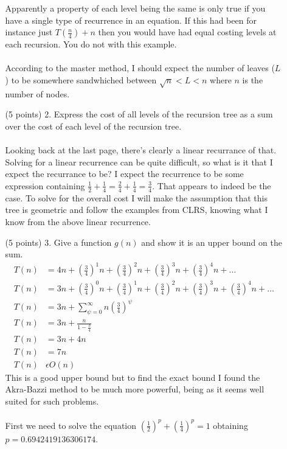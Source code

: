 \documentclass[paper=a4,fontsize=11pt]{article}
\begin{document}
\begin{enumerate}
\begin{enumerate}
Apparently a property of each level being the same is only true if you have a single type of recurrence in an equation. If this had been for instance just $T(\frac{n}{4}) + n$ then you would have had equal costing levels at each recursion. You do not with this example.\\\\
According to the master method, I should expect the number of leaves ($L$) to be somewhere sandwhiched between $\sqrt{n} < L < n$ where $n$ is the number of nodes.\\
\item [(5 points) 2.] Express the cost of all levels of the recursion tree as a sum over the cost of each level of the recursion tree.\\\\
Looking back at the last page, there's clearly a linear recurrance of that. Solving for a linear recurrence can be quite difficult, so what is it that I expect the recurrance to be? I expect the recurrence to be some expression containing $\frac{1}{2}+\frac{1}{4}=\frac{2}{4}+\frac{1}{4}=\frac{3}{4}$. That appears to indeed be the case. To solve for the overall cost I will make the assumption that this tree is geometric and follow the examples from CLRS, knowing what I know from the above linear recurrence.\\
\item [(5 points) 3.] Give a function $g (n)$ and show it is an upper bound on the sum.
\begin{align*}
T(n) &= 4n + (\frac{3}{4})^1n+(\frac{3}{4})^2n+(\frac{3}{4})^3n+(\frac{3}{4})^4n+\dots\\
T(n) &= 3n + (\frac{3}{4})^0n + (\frac{3}{4})^1n+(\frac{3}{4})^2n+(\frac{3}{4})^3n+(\frac{3}{4})^4n+\dots\\
T(n) &= 3n + \sum_{\psi=0}^{\infty}{n(\frac{3}{4})^\psi}\\
T(n) &= 3n + \frac{n}{1-\frac{3}{4}}\\
T(n) &= 3n + 4n\\
T(n) &= 7n\\
T(n) &\epsilon O(n)
\end{align*}
This is a good upper bound but to find the exact bound I found the Akra-Bazzi method to be much more powerful, being as it seems well suited for such problems.\\\\
First we need to solve the equation $(\frac{1}{2})^p+(\frac{1}{4})^p=1$ obtaining $p=0.6942419136306174$.\\
\begin{align*}

\end{align*}
\end{enumerate}
\end{enumerate}
\end{document}
